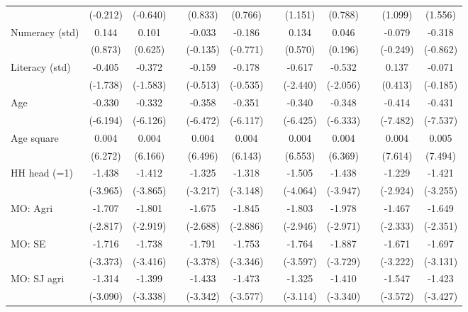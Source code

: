 {\begin{longtable}{@{\extracolsep{\fill}}lccccccccccc}
          & (-0.212) & (-0.640) &       & (0.833) & (0.766) &       & (1.151) & (0.788) &       & (1.099) & (1.556) \\
    Numeracy (std) & 0.144 & 0.101 &       & -0.033 & -0.186 &       & 0.134 & 0.046 &       & -0.079 & -0.318 \\
          & (0.873) & (0.625) &       & (-0.135) & (-0.771) &       & (0.570) & (0.196) &       & (-0.249) & (-0.862) \\
    Literacy (std) & -0.405 & -0.372 &       & -0.159 & -0.178 &       & -0.617 & -0.532 &       & 0.137 & -0.071 \\
          & (-1.738) & (-1.583) &       & (-0.513) & (-0.535) &       & (-2.440) & (-2.056) &       & (0.413) & (-0.185) \\
    Age   & -0.330 & -0.332 &       & -0.358 & -0.351 &       & -0.340 & -0.348 &       & -0.414 & -0.431 \\
          & (-6.194) & (-6.126) &       & (-6.472) & (-6.117) &       & (-6.425) & (-6.333) &       & (-7.482) & (-7.537) \\
    Age square & 0.004 & 0.004 &       & 0.004 & 0.004 &       & 0.004 & 0.004 &       & 0.004 & 0.005 \\
          & (6.272) & (6.166) &       & (6.496) & (6.143) &       & (6.553) & (6.369) &       & (7.614) & (7.494) \\
    HH head (=1) & -1.438 & -1.412 &       & -1.325 & -1.318 &       & -1.505 & -1.438 &       & -1.229 & -1.421 \\
          & (-3.965) & (-3.865) &       & (-3.217) & (-3.148) &       & (-4.064) & (-3.947) &       & (-2.924) & (-3.255) \\
    MO: Agri & -1.707 & -1.801 &       & -1.675 & -1.845 &       & -1.803 & -1.978 &       & -1.467 & -1.649 \\
          & (-2.817) & (-2.919) &       & (-2.688) & (-2.886) &       & (-2.946) & (-2.971) &       & (-2.333) & (-2.351) \\
    MO: SE & -1.716 & -1.738 &       & -1.791 & -1.753 &       & -1.764 & -1.887 &       & -1.671 & -1.697 \\
          & (-3.373) & (-3.416) &       & (-3.378) & (-3.346) &       & (-3.597) & (-3.729) &       & (-3.222) & (-3.131) \\
    MO: SJ agri & -1.314 & -1.399 &       & -1.433 & -1.473 &       & -1.325 & -1.410 &       & -1.547 & -1.423 \\
          & (-3.090) & (-3.338) &       & (-3.342) & (-3.577) &       & (-3.114) & (-3.340) &       & (-3.572) & (-3.427) \\

\end{longtable}}

